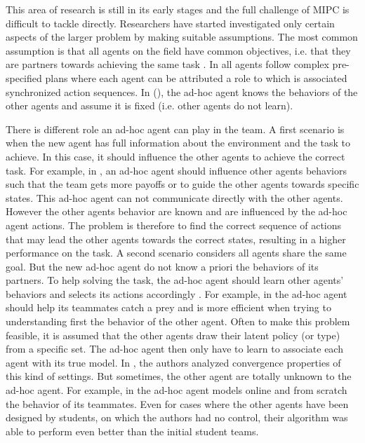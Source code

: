 This area of research is still in its early stages and the full challenge of MIPC is difficult to tackle directly. Researchers have started investigated only certain aspects of the larger problem by making suitable assumptions. The most common assumption is that all agents on the field have common objectives, i.e. that they are partners towards achieving the same task \cite{barrett2011empirical}. In \cite{bowling2005coordination,gil2006dynamically} all agents follow complex pre-specified plans where each agent can be attributed a role to which is associated synchronized action sequences. In (\cite{stone2010teach,stone2013teaching}), the ad-hoc agent knows the behaviors of the other agents and assume it is fixed (i.e. other agents do not learn). 

There is different role an ad-hoc agent can play in the team. A first scenario is when the new agent has full information about the environment and the task to achieve. In this case, it should influence the other agents to achieve the correct task. For example, in  \cite{stone2010teach,stone2013teaching}, an ad-hoc agent should influence other agents behaviors such that the team gets more payoffs or to guide the other agents towards specific states. This ad-hoc agent can not communicate directly with the other agents. However the other agents behavior are known and are influenced by the ad-hoc agent actions. The problem is therefore to find the correct sequence of actions that may lead the other agents towards the correct states, resulting in a higher performance on the task. A second scenario considers all agents share the same goal. But the new ad-hoc agent do not know a priori the behaviors of its partners. To help solving the task, the ad-hoc agent should learn other agents' behaviors and selects its actions accordingly  \cite{barrett2011adhoc,barrett2011empirical,barrett2013team}. For example, in \cite{barrett2011empirical} the ad-hoc agent should help its teammates catch a prey and is more efficient when trying to understanding first the behavior of the other agent. Often to make this problem feasible, it is assumed that the other agents draw their latent policy (or type) from a specific set. The ad-hoc agent then only have to learn to associate each agent with its true model. In \cite{albrecht2014uai}, the authors analyzed convergence properties of this kind of settings. But sometimes, the other agent are totally unknown to the ad-hoc agent. For example, in \cite{barrett2011empirical} the ad-hoc agent models online and from scratch the behavior of its teammates. Even for cases where the other agents have been designed by students, on which the authors had no control, their algorithm was able to perform even better than the initial student teams.

